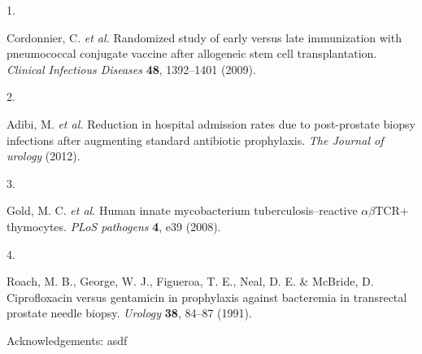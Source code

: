 \documentclass[
  9pt,
  letterpaper,
  DIV=11,
  numbers=noendperiod]{scrartcl}
\newlength{\cslhangindent}
\newlength{\csllabelwidth}
\newlength{\cslentryspacingunit} %
\newenvironment{CSLReferences}[2] %
 {%
  \setlength{\parindent}{0pt}
  \ifodd #1
  \let\oldpar\par
  \def\par{\hangindent=\cslhangindent\oldpar}
  \fi
  \setlength{\parskip}{#2\cslentryspacingunit}
 }%
 {}
\newcommand{\CSLLeftMargin}[1]{\parbox[t]{\csllabelwidth}{#1}}
\newcommand{\CSLRightInline}[1]{\parbox[t]{\linewidth - \csllabelwidth}{#1}\break}
\begin{document}
\hypertarget{refs}{}
\begin{CSLReferences}{0}{0}
\leavevmode{}%
\CSLLeftMargin{1. }%
\CSLRightInline{Cordonnier, C. \emph{et al.} Randomized study of early
versus late immunization with pneumococcal conjugate vaccine after
allogeneic stem cell transplantation. \emph{Clinical Infectious
Diseases} \textbf{48}, 1392--1401 (2009).}

\leavevmode{}%
\CSLLeftMargin{2. }%
\CSLRightInline{Adibi, M. \emph{et al.} Reduction in hospital admission
rates due to post-prostate biopsy infections after augmenting standard
antibiotic prophylaxis. \emph{The Journal of urology} (2012).}

\leavevmode{}%
\CSLLeftMargin{3. }%
\CSLRightInline{Gold, M. C. \emph{et al.} Human innate mycobacterium
tuberculosis--reactive \(\alpha\)\(\beta\)TCR+ thymocytes. \emph{PLoS
pathogens} \textbf{4}, e39 (2008).}

\leavevmode{}%
\CSLLeftMargin{4. }%
\CSLRightInline{Roach, M. B., George, W. J., Figueroa, T. E., Neal, D.
E. \& McBride, D. Ciprofloxacin versus gentamicin in prophylaxis against
bacteremia in transrectal prostate needle biopsy. \emph{Urology}
\textbf{38}, 84--87 (1991).}

\end{CSLReferences}

Acknowledgements: asdf
\end{document}
